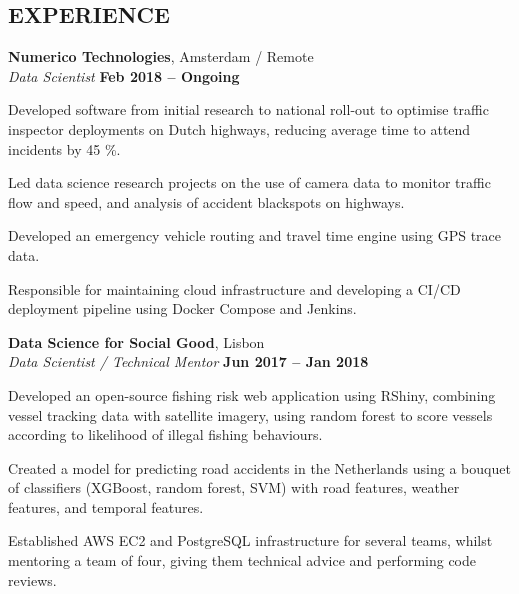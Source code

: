 \documentclass[margin,line]{resume}
\begin{document}
\begin{resume}
\sectionline
    \section{\mysidestyle \textbf{\large{E}\small{XPERIENCE}}}

    \textbf{\listing Numerico Technologies}, Amsterdam / Remote \vspace{2mm}\\\vspace{1mm}%
    \textsl{Data Scientist} \hfill \textbf{Feb 2018 -- Ongoing}
    \begin{list2}
        \item Developed software from initial research to national roll-out to optimise traffic inspector deployments on Dutch highways, reducing average time to attend incidents by 45 \%.
        \item Led data science research projects on the use of camera data to monitor traffic flow and speed, and analysis of accident blackspots on highways.
        \item Developed an emergency vehicle routing and travel time engine using GPS trace data.
        \item Responsible for maintaining cloud infrastructure and developing a CI/CD deployment pipeline using Docker Compose and Jenkins.
    \end{list2}

    \textbf{\listing Data Science for Social Good}, Lisbon \vspace{2mm}\\\vspace{1mm}%
    \textsl{Data Scientist / Technical Mentor} \hfill \textbf{Jun 2017 -- Jan 2018}
    \begin{list2}
        \item Developed an open-source fishing risk web application using RShiny, combining vessel tracking data with satellite imagery, using random forest to score vessels according to likelihood of illegal fishing behaviours.
        \item Created a model for predicting road accidents in the Netherlands using a bouquet of classifiers (XGBoost, random forest, SVM) with road features, weather features, and temporal features.
        \item Established AWS EC2 and PostgreSQL infrastructure for several teams, whilst mentoring a team of four, giving them technical advice and performing code reviews.
    \end{list2}


\end{resume}
\end{document}
